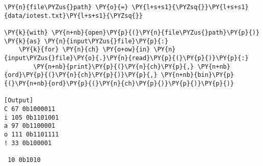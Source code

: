 \begin{Verbatim}[label=\makebox{\href{https://github.com/unipi-physics-labs/lab1-notes/tree/main/snippy/iotest.py}{https://github.com/.../iotest.py}},commandchars=\\\{\}]
\PY{n}{file\PYZus{}path} \PY{o}{=} \PY{l+s+s1}{\PYZsq{}}\PY{l+s+s1}{data/iotest.txt}\PY{l+s+s1}{\PYZsq{}}

\PY{k}{with} \PY{n+nb}{open}\PY{p}{(}\PY{n}{file\PYZus{}path}\PY{p}{)} \PY{k}{as} \PY{n}{input\PYZus{}file}\PY{p}{:}
    \PY{k}{for} \PY{n}{ch} \PY{o+ow}{in} \PY{n}{input\PYZus{}file}\PY{o}{.}\PY{n}{read}\PY{p}{(}\PY{p}{)}\PY{p}{:}
        \PY{n+nb}{print}\PY{p}{(}\PY{n}{ch}\PY{p}{,} \PY{n+nb}{ord}\PY{p}{(}\PY{n}{ch}\PY{p}{)}\PY{p}{,} \PY{n+nb}{bin}\PY{p}{(}\PY{n+nb}{ord}\PY{p}{(}\PY{n}{ch}\PY{p}{)}\PY{p}{)}\PY{p}{)}

[Output]
C 67 0b1000011
i 105 0b1101001
a 97 0b1100001
o 111 0b1101111
! 33 0b100001

 10 0b1010
\end{Verbatim}
